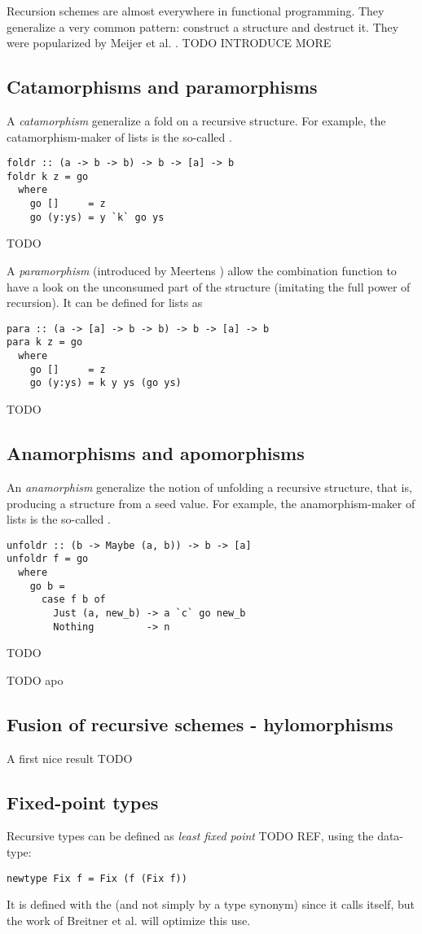 
Recursion schemes are almost everywhere in functional programming. They generalize a very common pattern: construct a structure and destruct it. They were popularized by Meijer et al. \cite{4cec4a43c86444479dc0003182424795}. TODO INTRODUCE MORE

\subsection{Catamorphisms and paramorphisms}
A \emph{catamorphism} generalize a fold on a recursive structure. For example, the catamorphism-maker of lists is the so-called .
\begin{verbatim}
foldr :: (a -> b -> b) -> b -> [a] -> b
foldr k z = go
  where
    go []     = z
    go (y:ys) = y `k` go ys
\end{verbatim}
TODO

A \emph{paramorphism} (introduced by Meertens \cite{Meertens1992}) allow the combination function to have a look on the unconsumed part of the structure (imitating the full power of recursion). It can be defined for lists as

\begin{verbatim}
para :: (a -> [a] -> b -> b) -> b -> [a] -> b
para k z = go
  where
    go []     = z
    go (y:ys) = k y ys (go ys)
\end{verbatim}

TODO
\subsection{Anamorphisms and apomorphisms}
An \emph{anamorphism} generalize the notion of unfolding a recursive structure, that is, producing a structure from a seed value.
For example, the anamorphism-maker of lists is the so-called .
\begin{verbatim}
unfoldr :: (b -> Maybe (a, b)) -> b -> [a]
unfoldr f = go
  where
    go b =
      case f b of
        Just (a, new_b) -> a `c` go new_b
        Nothing         -> n
\end{verbatim}
TODO

TODO apo
\subsection{Fusion of recursive schemes - hylomorphisms}
A first nice result TODO

\subsection{Fixed-point types}
\label{subsec:defi}
Recursive types can be defined as \emph{least fixed point} TODO REF, using the  data-type:
\begin{verbatim}
newtype Fix f = Fix (f (Fix f))
\end{verbatim}
It is defined with the  (and not simply by a type synonym) since it calls itself, but the work of Breitner et al. \cite{Breitner:2014:SZC:2692915.2628141} will optimize this use.

